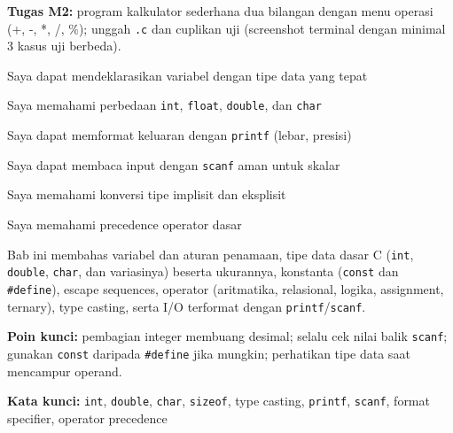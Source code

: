 \documentclass[../main.tex]{subfiles}
\begin{document}
\begin{asesmen}
\textbf{Tugas M2:} program kalkulator sederhana dua bilangan dengan menu operasi (+, -, *, /, \%); unggah \texttt{.c} dan cuplikan uji (screenshot terminal dengan minimal 3 kasus uji berbeda).
\end{asesmen}

\begin{checklist}
  \item Saya dapat mendeklarasikan variabel dengan tipe data yang tepat
  \item Saya memahami perbedaan \texttt{int}, \texttt{float}, \texttt{double}, dan \texttt{char}
  \item Saya dapat memformat keluaran dengan \texttt{printf} (lebar, presisi)
  \item Saya dapat membaca input dengan \texttt{scanf} aman untuk skalar
  \item Saya memahami konversi tipe implisit dan eksplisit
  \item Saya memahami precedence operator dasar
\end{checklist}

\begin{rangkuman}
Bab ini membahas variabel dan aturan penamaan, tipe data dasar C (\texttt{int}, \texttt{double}, \texttt{char}, dan variasinya) beserta ukurannya, konstanta (\texttt{const} dan \texttt{\#define}), escape sequences, operator (aritmatika, relasional, logika, assignment, ternary), type casting, serta I/O terformat dengan \texttt{printf}/\texttt{scanf}.

\textbf{Poin kunci:} pembagian integer membuang desimal; selalu cek nilai balik \texttt{scanf}; gunakan \texttt{const} daripada \texttt{\#define} jika mungkin; perhatikan tipe data saat mencampur operand.

\textbf{Kata kunci:} \texttt{int}, \texttt{double}, \texttt{char}, \texttt{sizeof}, type casting, \texttt{printf}, \texttt{scanf}, format specifier, operator precedence
\end{rangkuman}
\end{document}

